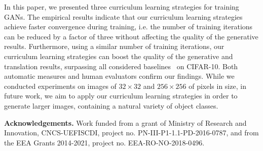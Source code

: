 \documentclass[10pt,twocolumn,letterpaper]{article}
\begin{document}
In this paper, we presented three curriculum learning strategies for training GANs. The empirical results indicate that our curriculum learning strategies achieve faster convergence during training, i.e. the number of training iterations can be reduced by a factor of three without affecting the quality of the generative results. Furthermore, using a similar number of training iterations, our curriculum learning strategies can boost the quality of the generative and translation results, surpassing all considered baselines~\cite{Avraham-CVPR-2019,Doan-AAAI-2019,Gulrajani-NIPS-2017,Hoshen-CVPR-2019,Miyato-ICLR-2018,Radford-ICLR-2016,Zhu-ICCV-2017} on CIFAR-10. Both automatic measures and human evaluators confirm our findings. While we conducted experiments on images of $32 \times 32$ and $256 \times 256$ of pixels in size, in future work, we aim to apply our curriculum learning strategies in order to generate larger images, containing a natural variety of object classes.

\noindent
{\bf Acknowledgements.}
Work funded from a grant of Ministry of Research and Innovation, CNCS-UEFISCDI, project no. PN-III-P1-1.1-PD-2016-0787, and from the EEA Grants 2014-2021, project no. EEA-RO-NO-2018-0496.

{\small


}
\end{document}
